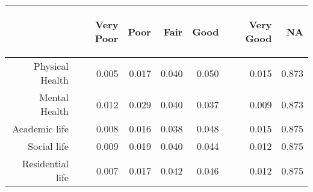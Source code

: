 \documentclass{article}\usepackage[]{graphicx}\usepackage[]{color}
\begin{document}
\begin{table}[ht]
\centering
\begin{tabular}{rrrrrrr}
  \hline
 & \begin{sideways} Very Poor \end{sideways} & \begin{sideways} Poor \end{sideways} & \begin{sideways} Fair \end{sideways} & \begin{sideways} Good \end{sideways} & \begin{sideways} Very Good \end{sideways} & \begin{sideways} NA \end{sideways} \\ 
  \hline
Physical Health & 0.005 & 0.017 & 0.040 & 0.050 & 0.015 & 0.873 \\ 
  Mental Health & 0.012 & 0.029 & 0.040 & 0.037 & 0.009 & 0.873 \\ 
  Academic life & 0.008 & 0.016 & 0.038 & 0.048 & 0.015 & 0.875 \\ 
  Social life & 0.009 & 0.019 & 0.040 & 0.044 & 0.012 & 0.875 \\ 
  Residential life & 0.007 & 0.017 & 0.042 & 0.046 & 0.012 & 0.875 \\ 
   \hline
\end{tabular}
\end{table}
\end{document}
